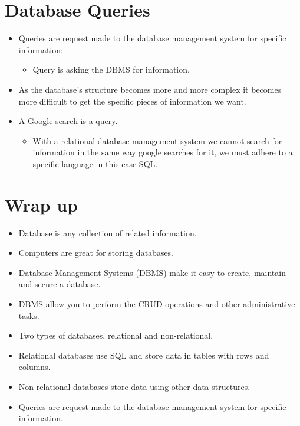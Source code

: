\section{Database Queries}
\begin{itemize}
    \item Queries are request made to the database management system for specific information:
        \begin{itemize}
            \item Query is asking the DBMS for information.
        \end{itemize}
    \item As the database's structure becomes more and more complex it becomes more difficult to get the specific pieces of information we want.
    \item A Google search is a query.
        \begin{itemize}
            \item With a relational database management system we cannot search for information in the same way google searches for it, we must adhere to a specific language in this case SQL.
        \end{itemize}
\end{itemize}

\section{Wrap up}
\begin{itemize}
    \item Database is any collection of related information.
    \item Computers are great for storing databases.
    \item Database Management Systems (DBMS) make it easy to create, maintain and secure a database.
    \item DBMS allow you to perform the CRUD operations and other administrative tasks.
    \item Two types of databases, relational and non-relational.
    \item Relational databases use SQL and store data in tables with rows and columns.
    \item Non-relational databases store data using other data structures.
    \item Queries are request made to the database management system for specific information.
\end{itemize}
